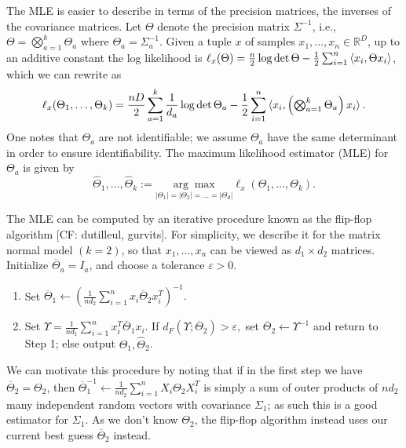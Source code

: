 \documentclass{article}
\newcommand{\R}{{\mathbb{R}}}
\newcommand\eps{\varepsilon}
\newcommand\samp{x}
\newcommand\rv{X}
\newcommand{\CF}[1]{{\color{purple}[CF: #1]}}
\begin{document}
The MLE is easier to describe in terms of the precision matrices, the inverses of the covariance matrices. Let $\Theta$ denote the precision matrix $\Sigma^{-1}$, i.e., $\Theta = \bigotimes_{a=1}^k \Theta_a$ where $\Theta_a = \Sigma_a^{-1}$. Given a tuple $\samp$ of samples  $\samp_1,\dots,\samp_n\in\R^D$, up to an additive constant the log likelihood is $
  \ell_{\samp}(\Theta)
  = \frac n2 \log \det \Theta - \frac12 \sum_{i=1}^n \braket{\samp_i, \Theta \samp_i}$, which we can rewrite as
\begin{align*}
  \ell_{\samp}(\Theta_1, \dots, \Theta_k)
  = \frac {n D} 2 \sum_{a = 1}^k \frac{1}{d_a} \log \det \Theta_a  - \frac12 \sum_{i=1}^n \braket{\samp_i, \left( \textstyle \bigotimes_{a=1}^k \Theta_a \right) \samp_i}.
\end{align*}
One notes that $\Theta_a$ are not identifiable; we assume $\Theta_a$ have the same determinant in order to ensure identifiability. The maximum likelihood estimator (MLE) for $\Theta_a$ is given by 
$$\widehat{\Theta}_1, \dots, \widehat{\Theta}_k := \underset{|\Theta_1| = |\Theta_2|= \dots = | \Theta_d|}{ \arg\max} \ell_x(\Theta_1, \dots, \Theta_k).$$



The MLE can be computed by an iterative procedure known as the flip-flop algorithm \CF{dutilleul, gurvits}. For simplicity, we describe it for the matrix normal model $(k = 2)$, so that $\samp_1, \dots, \samp_n$ can be viewed as $d_1\times d_2$ matrices. Initialize $\overline{\Theta}_a = I_a$, and choose a tolerance $\eps > 0$. 
\begin{enumerate}
\item Set $\overline{\Theta}_1 \leftarrow (\frac{1}{n d_2} \sum_{i = 1}^n \samp_i \overline{\Theta}_2 \samp_i^T)^{-1}.$ 
\item Set $\Upsilon = \frac{1}{n d_1} \sum_{i = 1}^n \samp_i^T \overline{\Theta}_1 \samp_i$.  If $d_F( \Upsilon; \overline{\Theta}_2) > \eps,$ set $\overline{\Theta}_2 \leftarrow \Upsilon^{-1}$ and return to Step 1; else output $\widehat{\Theta}_1, \widehat{\Theta}_2$.
\end{enumerate}
We can motivate this procedure by noting that if in the first step we have $\overline{\Theta}_2 = \Theta_2$, then $\overline{\Theta}_1^{-1} \leftarrow \frac{1}{n d_2} \sum_{i = 1}^n \rv_i \Theta_2 \rv_i^T$ is simply a sum of outer products of $nd_2$ many independent random vectors with covariance $\Sigma_1$; as such this is a good estimator for $\Sigma_1$. As we don't know $\Theta_2$, the flip-flop algorithm instead uses our current best guess $\overline{\Theta}_2$ instead. 
\end{document}

